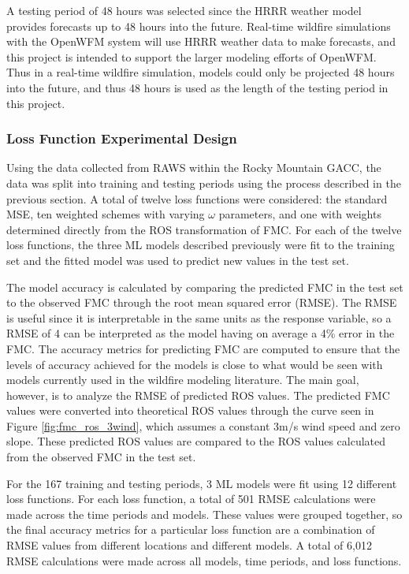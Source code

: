 \documentclass[11pt]{article}%
\begin{document}
A testing period of 48 hours was selected since the HRRR weather model provides forecasts up to 48 hours into the future. Real-time wildfire simulations with the OpenWFM system will use HRRR weather data to make forecasts, and this project is intended to support the larger modeling efforts of OpenWFM. Thus in a real-time wildfire simulation, models could only be projected 48 hours into the future, and thus 48 hours is used as the length of the testing period in this project.

\subsubsection{Loss Function Experimental Design}
\hfill

Using the data collected from RAWS within the Rocky Mountain GACC, the data was split into training and testing periods using the process described in the previous section. A total of twelve loss functions were considered: the standard MSE, ten weighted schemes with varying $\omega$ parameters, and one with weights determined directly from the ROS transformation of FMC. For each of the twelve loss functions, the three ML models described previously were fit to the training set and the fitted model was used to predict new values in the test set. 

The model accuracy is calculated by comparing the predicted FMC in the test set to the observed FMC through the root mean squared error (RMSE). The RMSE is useful since it is interpretable in the same units as the response variable, so a RMSE of 4 can be interpreted as the model having on average a 4\% error in the FMC. The accuracy metrics for predicting FMC are computed to ensure that the levels of accuracy achieved for the models is close to what would be seen with models currently used in the wildfire modeling literature. The main goal, however, is to analyze the RMSE of predicted ROS values. The predicted FMC values were converted into theoretical ROS values through the curve seen in Figure \ref{fig:fmc_ros_3wind}, which assumes a constant 3m/s wind speed and zero slope. These predicted ROS values are compared to the ROS values calculated from the observed FMC in the test set.

For the 167 training and testing periods, 3 ML models were fit using 12 different loss functions. For each loss function, a total of 501 RMSE calculations were made across the time periods and models. These values were grouped together, so the final accuracy metrics for a particular loss function are a combination of RMSE values from different locations and different models. A total of 6,012 RMSE calculations were made across all models, time periods, and loss functions.
\end{document}
